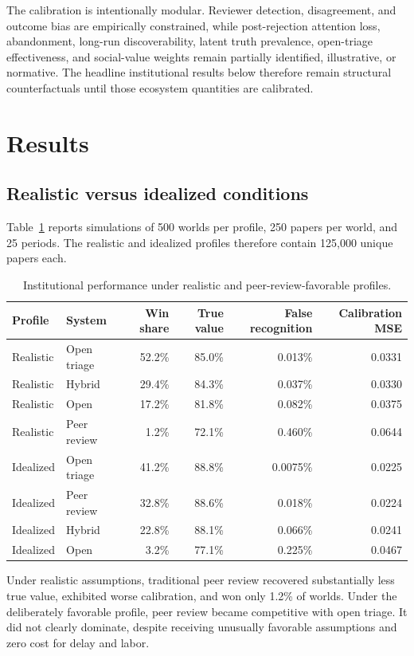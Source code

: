The calibration is intentionally modular. Reviewer detection, disagreement, and outcome bias are empirically constrained, while post-rejection attention loss, abandonment, long-run discoverability, latent truth prevalence, open-triage effectiveness, and social-value weights remain partially identified, illustrative, or normative. The headline institutional results below therefore remain structural counterfactuals until those ecosystem quantities are calibrated.

\section{Results}

\subsection{Realistic versus idealized conditions}

Table~\ref{tab:profiles} reports simulations of 500 worlds per profile, 250 papers per world, and 25 periods. The realistic and idealized profiles therefore contain 125,000 unique papers each.

\begin{table}[ht]
\centering
\caption{Institutional performance under realistic and peer-review-favorable profiles.}
\label{tab:profiles}
\small
\begin{tabular}{llrrrr}
\toprule
Profile & System & Win share & True value & False recognition & Calibration MSE\\
\midrule
Realistic & Open triage & 52.2\% & 85.0\% & 0.013\% & 0.0331\\
Realistic & Hybrid & 29.4\% & 84.3\% & 0.037\% & 0.0330\\
Realistic & Open & 17.2\% & 81.8\% & 0.082\% & 0.0375\\
Realistic & Peer review & 1.2\% & 72.1\% & 0.460\% & 0.0644\\
\midrule
Idealized & Open triage & 41.2\% & 88.8\% & 0.0075\% & 0.0225\\
Idealized & Peer review & 32.8\% & 88.6\% & 0.018\% & 0.0224\\
Idealized & Hybrid & 22.8\% & 88.1\% & 0.066\% & 0.0241\\
Idealized & Open & 3.2\% & 77.1\% & 0.225\% & 0.0467\\
\bottomrule
\end{tabular}
\end{table}

Under realistic assumptions, traditional peer review recovered substantially less true value, exhibited worse calibration, and won only 1.2\% of worlds. Under the deliberately favorable profile, peer review became competitive with open triage. It did not clearly dominate, despite receiving unusually favorable assumptions and zero cost for delay and labor.

